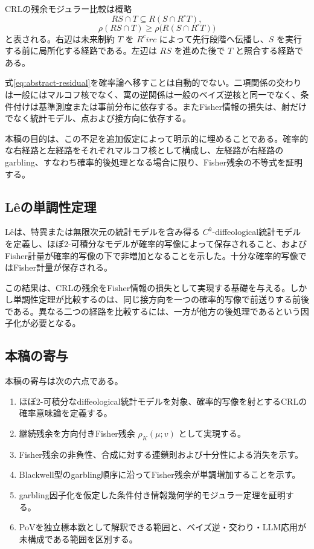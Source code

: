 \documentclass[a4paper,11pt]{ltjsarticle}
\theoremstyle{definition}
\theoremstyle{plain}
\begin{document}
CRLの残余モジュラー比較は概略
\begin{equation}
 RS\cap T
 \subseteq
 R(S\cap R^\circ T),
 \label{eq:abstract-modular}
\end{equation}
\begin{equation}
 \rho(RS\cap T)
 \geq
 \rho\bigl(R(S\cap R^\circ T)\bigr)
 \label{eq:abstract-residual}
\end{equation}
と表される。右辺は未来制約 $T$ を $R^circ$ によって先行段階へ伝播し、$S$ を実行する前に局所化する経路である。左辺は $RS$ を進めた後で $T$ と照合する経路である。

式\eqref{eq:abstract-residual}を確率論へ移すことは自動的でない。二項関係の交わりは一般にはマルコフ核でなく、寓の逆関係は一般のベイズ逆核と同一でなく、条件付けは基準測度または事前分布に依存する。またFisher情報の損失は、射だけでなく統計モデル、点および接方向に依存する。

本稿の目的は、この不足を追加仮定によって明示的に埋めることである。確率的な右経路と左経路をそれぞれマルコフ核として構成し、左経路が右経路のgarbling、すなわち確率的後処理となる場合に限り、Fisher残余の不等式を証明する。

\subsection{Lêの単調性定理}

Lêは、特異または無限次元の統計モデルを含み得る $C^k$-diffeological統計モデルを定義し、ほぼ2-可積分なモデルが確率的写像によって保存されること、およびFisher計量が確率的写像の下で非増加となることを示した\cite{Le2020DiffeologicalStatistics}。十分な確率的写像ではFisher計量が保存される。

この結果は、CRLの残余をFisher情報の損失として実現する基礎を与える。しかし単調性定理が比較するのは、同じ接方向を一つの確率的写像で前送りする前後である。異なる二つの経路を比較するには、一方が他方の後処理であるという因子化が必要となる。

\subsection{本稿の寄与}

本稿の寄与は次の六点である。
\begin{enumerate}
 \item ほぼ2-可積分なdiffeological統計モデルを対象、確率的写像を射とするCRLの確率意味論を定義する。
 \item 継続残余を方向付きFisher残余 $\rho_K(\mu;v)$ として実現する。
 \item Fisher残余の非負性、合成に対する連鎖則および十分性による消失を示す。
 \item Blackwell型のgarbling順序に沿ってFisher残余が単調増加することを示す。
 \item garbling因子化を仮定した条件付き情報幾何学的モジュラー定理を証明する。
 \item PoVを独立標本数として解釈できる範囲と、ベイズ逆・交わり・LLM応用が未構成である範囲を区別する。
\end{enumerate}
\end{document}

